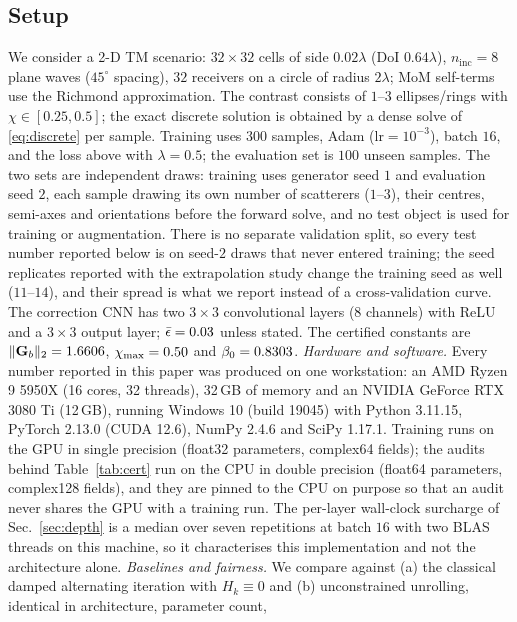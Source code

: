 \documentclass[journal,cmes,article,submit,moreauthors,pdftex]{Definitions/tsp}
\newcommand{\norm}[1]{\lVert #1 \rVert}
\newcommand{\numv}[1]{#1}
\begin{document}
\subsection{Setup}
\label{sec:setup}
We consider a 2-D TM scenario: $32\times32$ cells of side $0.02\lambda$ (DoI $0.64\lambda$),
$n_{\mathrm{inc}}=8$ plane waves ($45^\circ$ spacing), $32$ receivers on a circle of radius
$2\lambda$; MoM self-terms use the Richmond approximation. The contrast consists of $1$--$3$
ellipses/rings with $\chi\in[0.25,0.5]$; the exact discrete solution is obtained by a dense
solve of \eqref{eq:discrete} per sample. Training uses $300$ samples, Adam
($\mathrm{lr}=10^{-3}$), batch $16$, and the loss above with $\lambda=0.5$; the evaluation set is
$100$ unseen samples. The two sets are independent draws: training uses generator seed $1$ and
evaluation seed $2$, each sample drawing its own number of scatterers ($1$--$3$), their centres,
semi-axes and orientations before the forward solve, and no test object is used for training or
augmentation. There is no separate validation split, so every test number reported below is on
seed-$2$ draws that never entered training; the seed replicates reported with the extrapolation
study change the training seed as well ($11$--$14$), and their spread is what we report instead of
a cross-validation curve. The correction CNN has
two $3\times3$ convolutional layers ($8$ channels) with ReLU and a $3\times3$ output layer;
$\bar\epsilon=\numv{\epsbar}$ unless stated. The certified constants are
$\norm{\mathbf{G}_b}_2=\numv{\gbnorm}$, $\chi_{\max}=\numv{\chimax}$ and
$\beta_0=\numv{\betacert}$.
\emph{Hardware and software.} Every number reported in this paper was produced on one
workstation: an AMD Ryzen 9 5950X (16 cores, 32 threads), 32\,GB of memory and an NVIDIA
GeForce RTX 3080 Ti (12\,GB), running Windows 10 (build 19045) with Python 3.11.15,
PyTorch 2.13.0 (CUDA 12.6), NumPy 2.4.6 and SciPy 1.17.1. Training runs on the GPU in single
precision (float32 parameters, complex64 fields); the audits behind Table~\ref{tab:cert} run on
the CPU in double precision (float64 parameters, complex128 fields), and they are pinned to the
CPU on purpose so that an audit never shares the GPU with a training run. The per-layer
wall-clock surcharge of Sec.~\ref{sec:depth} is a median over seven repetitions at batch $16$
with two BLAS threads on this machine, so it characterises this implementation and not the
architecture alone.
\emph{Baselines and fairness.} We compare against (a) the classical damped alternating iteration
with $H_k\equiv0$ and (b) unconstrained unrolling, identical in architecture, parameter count,
\end{document}
